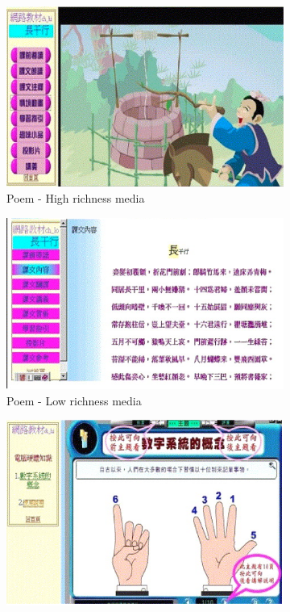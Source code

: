\begin{figure}[!hbt]\centering
    \begin{subfigure}{0.45\textwidth}
 \includegraphics[width=\textwidth]{media1}
 \caption{Poem - High richness media}
    \end{subfigure}\hspace{0.05\textwidth}
    \begin{subfigure}{0.45\textwidth}
\includegraphics[width=\textwidth]{media2}
  \caption{Poem - Low richness media}
    \end{subfigure}
    \begin{subfigure}{0.45\textwidth}
        \includegraphics[width=\textwidth]{media3}

\end{subfigure}
\end{figure}
